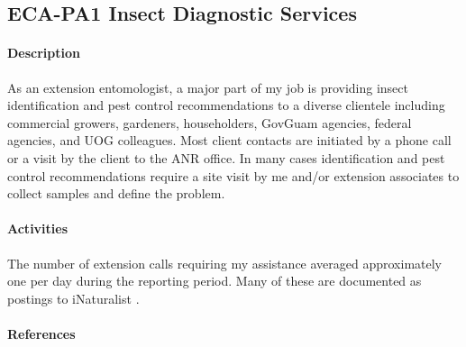 \subsection{ECA-PA1 Insect Diagnostic Services}
\begin{refsection}

\paragraph{Description}	
As an extension entomologist, a major part of my job is providing
insect identification and pest control recommendations to a diverse
clientele including commercial growers, gardeners, householders, GovGuam
agencies, federal agencies, and UOG colleagues. Most client contacts
are initiated by a phone call or a visit by the client to the ANR
office. In many cases identification and pest control recommendations
require a site visit by me and/or extension associates to collect
samples and define the problem.

\paragraph{Activities}
The number of extension calls requiring my assistance averaged approximately
one per day during the reporting period. Many of these are documented
as postings to iNaturalist \cite{moore_inat_since_2020-06-15}.
\paragraph{References}
\printbibliography[heading=none]
\end{refsection}

